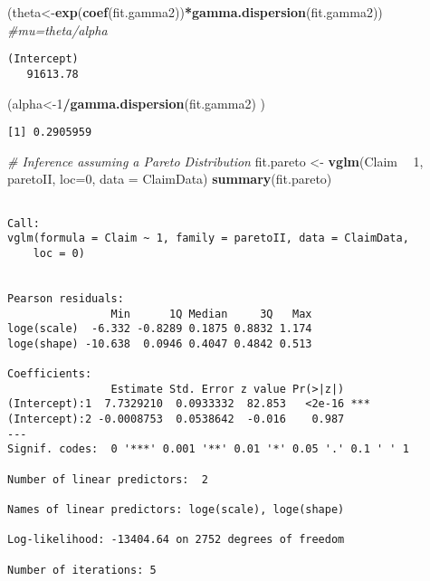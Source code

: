 \documentclass[]{book}
\newenvironment{Shaded}{\begin{snugshade}}{\end{snugshade}}
\newcommand{\KeywordTok}[1]{\textcolor[rgb]{0.13,0.29,0.53}{\textbf{#1}}}
\newcommand{\DataTypeTok}[1]{\textcolor[rgb]{0.13,0.29,0.53}{#1}}
\newcommand{\DecValTok}[1]{\textcolor[rgb]{0.00,0.00,0.81}{#1}}
\newcommand{\StringTok}[1]{\textcolor[rgb]{0.31,0.60,0.02}{#1}}
\newcommand{\CommentTok}[1]{\textcolor[rgb]{0.56,0.35,0.01}{\textit{#1}}}
\newcommand{\OperatorTok}[1]{\textcolor[rgb]{0.81,0.36,0.00}{\textbf{#1}}}
\newcommand{\NormalTok}[1]{#1}
\theoremstyle{definition}
\theoremstyle{definition}
\theoremstyle{definition}
\theoremstyle{remark}
\begin{document}
\begin{Shaded}
\begin{Highlighting}[]
\NormalTok{(theta<-}\KeywordTok{exp}\NormalTok{(}\KeywordTok{coef}\NormalTok{(fit.gamma2))}\OperatorTok{*}\KeywordTok{gamma.dispersion}\NormalTok{(fit.gamma2)) }\CommentTok{#mu=theta/alpha}
\end{Highlighting}
\end{Shaded}

\begin{verbatim}
(Intercept) 
   91613.78 
\end{verbatim}

\begin{Shaded}
\begin{Highlighting}[]
\NormalTok{(alpha<-}\DecValTok{1}\OperatorTok{/}\KeywordTok{gamma.dispersion}\NormalTok{(fit.gamma2) )}
\end{Highlighting}
\end{Shaded}

\begin{verbatim}
[1] 0.2905959
\end{verbatim}

\begin{Shaded}
\begin{Highlighting}[]
\CommentTok{#  Inference assuming a Pareto Distribution}
\NormalTok{fit.pareto <-}\StringTok{ }\KeywordTok{vglm}\NormalTok{(Claim }\OperatorTok{~}\StringTok{ }\DecValTok{1}\NormalTok{, paretoII, }\DataTypeTok{loc=}\DecValTok{0}\NormalTok{, }\DataTypeTok{data =}\NormalTok{ ClaimData)}
\KeywordTok{summary}\NormalTok{(fit.pareto)}
\end{Highlighting}
\end{Shaded}

\begin{verbatim}

Call:
vglm(formula = Claim ~ 1, family = paretoII, data = ClaimData, 
    loc = 0)


Pearson residuals:
                Min      1Q Median     3Q   Max
loge(scale)  -6.332 -0.8289 0.1875 0.8832 1.174
loge(shape) -10.638  0.0946 0.4047 0.4842 0.513

Coefficients: 
                Estimate Std. Error z value Pr(>|z|)    
(Intercept):1  7.7329210  0.0933332  82.853   <2e-16 ***
(Intercept):2 -0.0008753  0.0538642  -0.016    0.987    
---
Signif. codes:  0 '***' 0.001 '**' 0.01 '*' 0.05 '.' 0.1 ' ' 1

Number of linear predictors:  2 

Names of linear predictors: loge(scale), loge(shape)

Log-likelihood: -13404.64 on 2752 degrees of freedom

Number of iterations: 5 
\end{verbatim}
\end{document}

